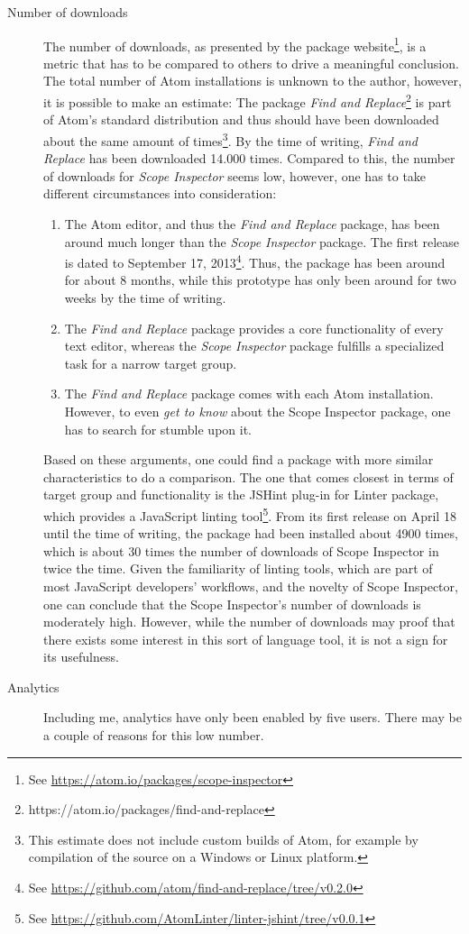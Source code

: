 \begin{description}
\item[Number of downloads]
The number of downloads, as presented by the package
website\footnote{See \url{https://atom.io/packages/scope-inspector}}, is
a metric that has to be compared to others to drive a meaningful
conclusion. The total number of Atom installations is unknown to the
author, however, it is possible to make an estimate: The package
\emph{Find and
Replace}\footnote{https://atom.io/packages/find-and-replace} is part of
Atom’s standard distribution and thus should have been downloaded about
the same amount of
times\footnote{This estimate does not include custom builds of Atom, for example by compilation of the source on a Windows or Linux platform.}.
By the time of writing, \emph{Find and Replace} has been downloaded
14.000 times. Compared to this, the number of downloads for \emph{Scope
Inspector} seems low, however, one has to take different circumstances
into consideration:

\begin{enumerate}
\def\labelenumi{\arabic{enumi}.}
\itemsep1pt\parskip0pt
\item
  The Atom editor, and thus the \emph{Find and Replace} package, has
  been around much longer than the \emph{Scope Inspector} package. The
  first release is dated to September 17,
  2013\footnote{See \url{https://github.com/atom/find-and-replace/tree/v0.2.0}}.
  Thus, the package has been around for about 8 months, while this
  prototype has only been around for two weeks by the time of writing.
\item
  The \emph{Find and Replace} package provides a core functionality of
  every text editor, whereas the \emph{Scope Inspector} package fulfills
  a specialized task for a narrow target group.
\item
  The \emph{Find and Replace} package comes with each Atom installation.
  However, to even \emph{get to know} about the Scope Inspector package,
  one has to search for stumble upon it.
\end{enumerate}

Based on these arguments, one could find a package with more similar
characteristics to do a comparison. The one that comes closest in terms
of target group and functionality is the JSHint plug-in for Linter
package, which provides a JavaScript linting
tool\footnote{See \url{https://github.com/AtomLinter/linter-jshint/tree/v0.0.1}}.
From its first release on April 18 until the time of writing, the
package had been installed about 4900 times, which is about 30 times the
number of downloads of Scope Inspector in twice the time. Given the
familiarity of linting tools, which are part of most JavaScript
developers’ workflows, and the novelty of Scope Inspector, one can
conclude that the Scope Inspector’s number of downloads is moderately
high. However, while the number of downloads may proof that there exists
some interest in this sort of language tool, it is not a sign for its
usefulness.
\item[Analytics]
Including me, analytics have only been enabled by five users. There may
be a couple of reasons for this low number.


\end{description}
